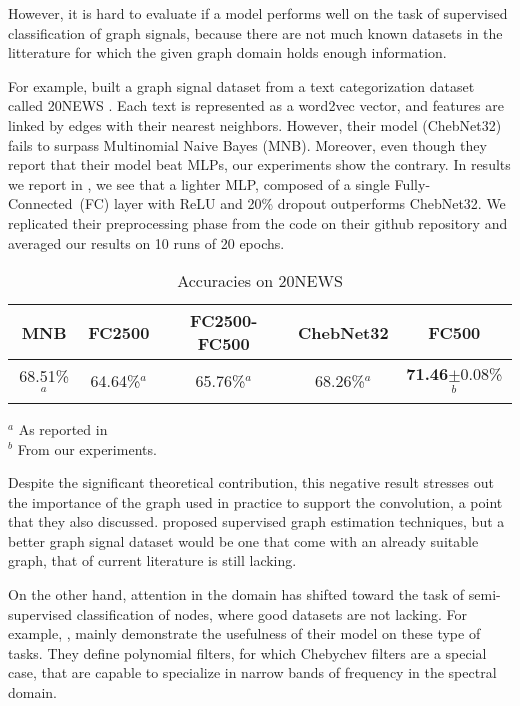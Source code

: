 However, it is hard to evaluate if a model performs well on the task of supervised classification of graph signals, because there are not much known datasets in the litterature for which the given graph domain holds enough information.

For example, \citeauthor{defferrard2016convolutional} built a graph signal dataset from a text categorization dataset called 20NEWS \citep{joachims1996probabilistic}. Each text is represented as a word2vec vector, and features are linked by edges with their nearest neighbors. However, their model (ChebNet32) fails to surpass Multinomial Naive Bayes (MNB). Moreover, even though they report that their model beat MLPs, our experiments show the contrary. In results we report in , we see that a lighter MLP, composed of a single Fully-Connected~(FC) layer with ReLU and 20\% dropout outperforms ChebNet32. We replicated their preprocessing phase from the code on their github repository and averaged our results on 10 runs of 20 epochs.

\begin{table}[H]
  \caption{Accuracies on 20NEWS}
  \begin{center}
    \bgroup
    \def\arraystretch{1.5}%
    \begin{tabular}{|c|c|c|c|c|}
      \hline
      MNB & FC2500 & FC2500-FC500 & ChebNet32 & FC500\\
      \hline
      68.51\%$^a$ & 64.64\%$^a$ & 65.76\%$^a$ & 68.26\%$^a$ & \textbf{71.46}$\pm$0.08\%$^b$\\
      \hline
    \end{tabular}
    \egroup
  \end{center}
\begin{flushleft}
\footnotesize{
$^a$ As reported in \cite{defferrard2016convolutional}\\
$^b$ From our experiments.
}
\end{flushleft}
  \label{tab:20}
\end{table}

Despite the significant theoretical contribution, this negative result stresses out the importance of the graph used in practice to support the convolution, a point that they also discussed. \cite{henaff2015deep} proposed supervised graph estimation techniques, but a better graph signal dataset would be one that come with an already suitable graph, that of current literature is still lacking.

On the other hand, attention in the domain has shifted toward the task of semi-supervised classification of nodes, where good datasets are not lacking. For example, \cite{levie2017cayleynets}, mainly demonstrate the usefulness of their model on these type of tasks. They define polynomial filters, for which Chebychev filters are a special case, that are capable to specialize in narrow bands of frequency in the spectral domain.

